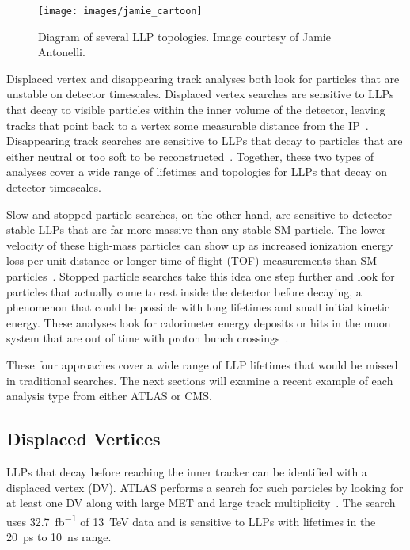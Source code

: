 \documentclass[12pt]{article}
\begin{document}
        \noindent \begin{figure}[htbp] \begin{center}
        \texttt{[image: images/jamie\_cartoon]}
        \caption{Diagram of several LLP topologies. Image courtesy of Jamie Antonelli.}
        \label{jamie_cartoon}
        \end{center} \end{figure}

        Displaced vertex and disappearing track analyses both look for particles that are unstable on detector timescales. Displaced vertex searches are sensitive to LLPs that decay to visible particles within the inner volume of the detector, leaving tracks that point back to a vertex some measurable distance from the IP~\cite{atlas_displaced}. Disappearing track searches are sensitive to LLPs that decay to particles that are either neutral or too soft to be reconstructed~\cite{atlas_disappearing}. Together, these two types of analyses cover a wide range of lifetimes and topologies for LLPs that decay on detector timescales.

        Slow and stopped particle searches, on the other hand, are sensitive to detector-stable LLPs that are far more massive than any stable SM particle. The lower velocity of these high-mass particles can show up as increased ionization energy loss per unit distance or longer time-of-flight (TOF) measurements than SM particles~\cite{cms_hscp}. Stopped particle searches take this idea one step further and look for particles that actually come to rest inside the detector before decaying, a phenomenon that could be possible with long lifetimes and small initial kinetic energy. These analyses look for calorimeter energy deposits or hits in the muon system that are out of time with proton bunch crossings~\cite{cms_stopped}.

        These four approaches cover a wide range of LLP lifetimes that would be missed in traditional searches. The next sections will examine a recent example of each analysis type from either ATLAS or CMS.

    \subsection{Displaced Vertices}
        LLPs that decay before reaching the inner tracker can be identified with a displaced vertex (DV). ATLAS performs a search for such particles by looking for at least one DV along with large MET and large track multiplicity~\cite{atlas_displaced}. The search uses \SI{32.7}{\femto\barn^{-1}} of \SI{13}{TeV} data and is sensitive to LLPs with lifetimes in the \SI{20}{\pico\s} to \SI{10}{\nano\s} range.
\end{document}
